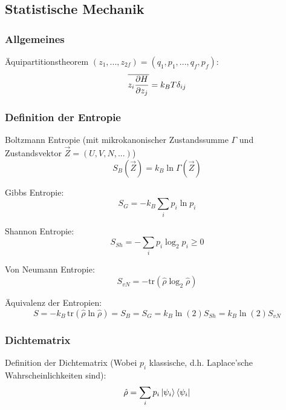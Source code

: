 \documentclass[11pt]{article}
\numberwithin{equation}{section}
\begin{document}
    \subsection{Statistische Mechanik}
      \subsubsection{Allgemeines}
        Äquipartitionstheorem $(z_1,...,z_{2f}) = (q_1, p_1, ..., q_f, p_f)$:
        \begin{equation}
          \overline{ z_i \frac{\partial H}{\partial z_j}} = k_B T \delta_{ij}
        \end{equation}

      \subsubsection{Definition der Entropie}
        Boltzmann Entropie (mit mikrokanonischer Zustandssumme $\Gamma$ und Zustandsvektor $\vec{Z}=(U,V,N,...)$)
        \begin{equation}
          S_{B}(\vec{Z}) = k_B \ln\Gamma(\vec{Z})
        \end{equation}

        Gibbs Entropie:
        \begin{equation}
          S_{G} = -k_B \sum_i p_i \ln p_i
        \end{equation}

        Shannon Entropie:
        \begin{equation}
          S_{Sh} = -\sum_i p_i\log_2{p_i} \ge 0
        \end{equation}

        Von Neumann Entropie:
        \begin{equation}
          S_{vN} = -\mathrm{tr}(\hat{\rho}\log_2\hat{\rho})
        \end{equation}

        Äquivalenz der Entropien:
        \begin{equation}
          S = -k_B\,\mathrm{tr}(\hat{\rho} \ln \hat{\rho}) = S_B = S_G = k_B\ln(2) S_{Sh} = k_B\ln(2) S_{vN}
        \end{equation}

      \subsubsection{Dichtematrix}
        Definition der Dichtematrix (Wobei $p_i$ klassische, d.h. Laplace'sche Wahrscheinlichkeiten sind):
        \begin{equation}
          \hat{\rho} = \sum_i p_i \Ket{\psi_i}\Bra{\psi_i}
        \end{equation}
\end{document}
